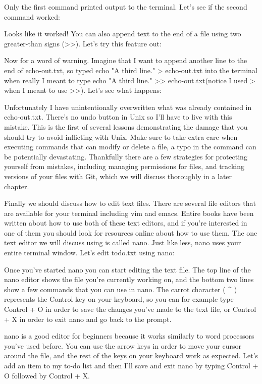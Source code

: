 Only the first command printed output to the terminal. Let’s see if the second command worked:

Looks like it worked! You can also append text to the end of a file using two greater-than signs (>>). Let’s try this feature out:

Now for a word of warning. Imagine that I want to append another line to the end of echo-out.txt, so typed echo "A third line." > echo-out.txt into the terminal when really I meant to type echo "A third line." >> echo-out.txt(notice I used > when I meant to use >>). Let’s see what happens:

Unfortunately I have unintentionally overwritten what was already contained in echo-out.txt. There’s no undo button in Unix so I’ll have to live with this mistake. This is the first of several lessons demonstrating the damage that you should try to avoid inflicting with Unix. Make sure to take extra care when executing commands that can modify or delete a file, a typo in the command can be potentially devastating. Thankfully there are a few strategies for protecting yourself from mistakes, including managing permissions for files, and tracking versions of your files with Git, which we will discuss thoroughly in a later chapter.

Finally we should discuss how to edit text files. There are several file editors that are available for your terminal including vim and emacs. Entire books have been written about how to use both of these text editors, and if you’re interested in one of them you should look for resources online about how to use them. The one text editor we will discuss using is called nano. Just like less, nano uses your entire terminal window. Let’s edit todo.txt using nano:

Once you’ve started nano you can start editing the text file. 
The top line of the nano editor shows the file you’re currently working on, and the bottom two lines show a few commands that you can use in nano. The carrot character ( \string^ ) represents the Control key on your keyboard, so you can for example type Control + O in order to save the changes you’ve made to the text file, or Control + X in order to exit nano and go back to the prompt.

nano is a good editor for beginners because it works similarly to word processors you’ve used before. You can use the arrow keys in order to move your cursor around the file, and the rest of the keys on your keyboard work as expected. Let’s add an item to my to-do list and then I’ll save and exit nano by typing Control + O followed by Control + X.

